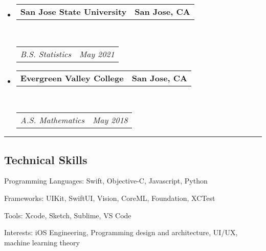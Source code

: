 \documentclass[9pt,letterpaper]{article}
\makeatletter
\newenvironment{indentsection}[1]%
{\begin{list}{}%
	{\setlength{\leftmargin}{#1}}%
	\item[]%
}
{\end{list}}
\newcommand{\headerrow}[2]
{\begin{tabular*}{\linewidth}{l@{\extracolsep{\fill}}r}
	#1 &
	#2 \\
\end{tabular*}}
\makeatother
\begin{document}
\begin{itemize}
	\parskip=0.1em

	\item
	\headerrow
		{\textbf{San Jose State University}}
		{\textbf{San Jose, CA}}
	\\
	\headerrow
		{\emph{B.S. Statistics}}
		{\emph{May 2021}}
	\item
	\headerrow
		{\textbf{Evergreen Valley College}}
		{\textbf{San Jose, CA}}
	\\
	\headerrow
		{\emph{A.S. Mathematics}}
		{\emph{May 2018}}

\end{itemize}

\hrule
\vspace{-0.4em}
\subsection*{Technical Skills}

\begin{indentsection}{\parindent}
\begin{description*}
	\item[Programming Languages:]
	Swift, Objective-C, Javascript, Python
	\item[Frameworks:]
	UIKit, SwiftUI, Vision, CoreML, Foundation, XCTest
	\item[Tools:]
	Xcode, Sketch, Sublime, VS Code
	\item[Interests:]
	iOS Engineering, Programming design and architecture, UI/UX, machine learning theory
\end{description*}
\end{indentsection}
\end{document}
